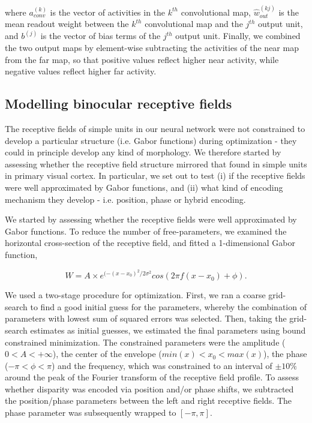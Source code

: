 where $a_{conv}^{(k)}$ is the vector of activities in the $k^{th}$ convolutional map, $\hat{w}_{out}^{(kj)}$ is the mean readout weight between the $k^{th}$ convolutional map and the $j^{th}$ output unit, and $b^{(j)}$ is the vector of bias terms of the $j^{th}$ output unit. Finally, we combined the two output maps by element-wise subtracting the activities of the near map from the far map, so that positive values reflect higher near activity, while negative values reflect higher far activity.


\subsection{Modelling binocular receptive fields}

The receptive fields of simple units in our neural network were not constrained to develop a particular structure (i.e. Gabor functions) during optimization - they could in principle develop any kind of morphology. We therefore started by assessing whether the receptive field structure mirrored that found in simple units in primary visual cortex. In particular, we set out to test (i) if the receptive fields were well approximated by Gabor functions, and (ii) what kind of encoding mechanism they develop - i.e. position, phase or hybrid encoding.

We started by assessing whether the receptive fields were well approximated by Gabor functions. To reduce the number of free-parameters, we examined the horizontal cross-section of the receptive field, and fitted a 1-dimensional Gabor function,

\begin{equation}
  W= A \times e^{(-(x-x_0)^2/2\sigma^2}  cos⁡(2 \pi f(x-x_0)+\phi).
\end{equation}

We used a two-stage procedure for optimization. First, we ran a coarse grid-search to find a good initial guess for the parameters, whereby the combination of parameters with lowest sum of squared errors was selected. Then, taking the grid-search estimates as initial guesses, we estimated the final parameters using bound constrained minimization. The constrained parameters were the amplitude ($0<A<+\infty$), the center of the envelope ($min(x)<x_0<max(x)$), the phase ($-\pi<\phi<\pi$) and the frequency, which was constrained to an interval of $\pm10 \%$ around the peak of the Fourier transform of the receptive field profile. To assess whether disparity was encoded via position and/or phase shifts, we subtracted the position/phase parameters between the left and right receptive fields. The phase parameter was subsequently wrapped to $[-\pi, \pi]$.


